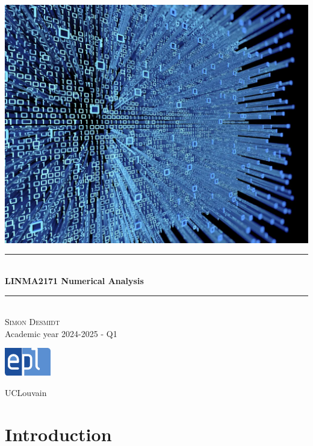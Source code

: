 \documentclass[12pt, openany]{report}
\newcommand{\HRule}{\rule{\linewidth}{0.5mm}}
\theoremstyle{definition}
\begin{document}
\begin{titlepage}
    \begin{sffamily}
    \begin{center}
        \includegraphics[scale=0.25]{img/Page de garde.png} \\[1cm]
        \HRule \\[0.4cm]
        { \huge \bfseries LINMA2171 Numerical Analysis \\[0.4cm] }
    
        \HRule \\[1.5cm]
        \textsc{\LARGE Simon Desmidt}\\[1cm]
        \vfill
        \vspace{2cm}
        {\large Academic year 2024-2025 - Q1}
        \vspace{0.4cm}
         
        \includegraphics[width=0.15\textwidth]{img/epl.png}
        
        UCLouvain\\
    
    \end{center}
    \end{sffamily}
\end{titlepage}

\setcounter{tocdepth}{1}
\tableofcontents
\chapter{Introduction}
\end{document}
